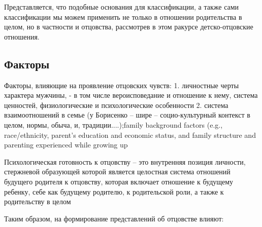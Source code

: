 \documentclass{../../common/thesisbyxetex}
\begin{document}
Представляется, что подобные основания для классификации, а также сами классификации мы можем
применить не только в отношении родительства в целом, но в частности и отцовства, рассмотрев в этом
ракурсе детско-отцовские отношения.








\subsection{Факторы}


Факторы, влияющие на проявление отцовских чувств:
1. личностные черты характера мужчины,
- в том числе вероисповедание и отношение к нему, система ценностей, физиологические и
психологические особенности
2. система взаимоотношений в семье (у Борисенко – шире – социо-культурный контекст в целом, нормы,
обыча, и, традиции....)\cite{psyot};family background factors (e.g.,
race/ethnicity, parent’s education and economic status, and
family structure and parenting experienced while growing up \cite[164]{long}


Психологическая готовность к отцовству – это внутренняя позиция личности,
стержневой образующей которой является целостная система отношений будущего
родителя к отцовству, которая включает отношение к будущему ребенку, себе как
будущему родителю, к родительской роли, а также к родительству в целом \cite[121]{har}

Таким образом, на формирование представлений об отцовстве влияют:
\end{document}
